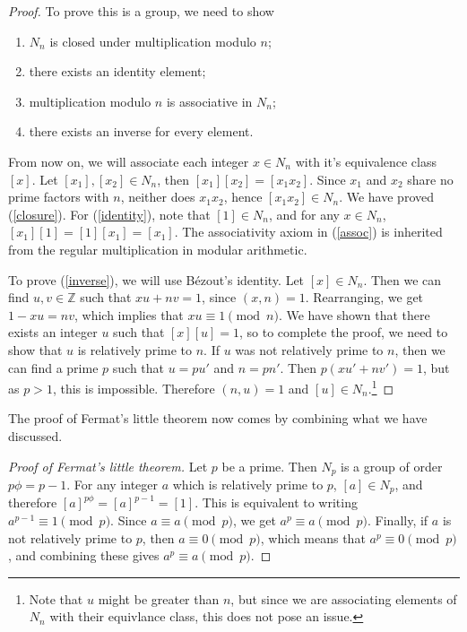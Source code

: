 \documentclass[12pt]{article}
\theoremstyle{theorem}
\theoremstyle{theorem}
\theoremstyle{definition}
\theoremstyle{example}
\theoremstyle{remark}
\theoremstyle{propposition}
\theoremstyle{lemma}
\begin{document}
\begin{proof}
  To prove this is a group, we need to show
  \begin{enumerate}
  \item $N_n$ is closed under multiplication modulo $n$;\label{closure}
  \item there exists an identity element;\label{identity}
  \item multiplication modulo $n$ is associative in $N_n$;\label{assoc}
  \item there exists an inverse for every element.\label{inverse}
  \end{enumerate}

  From now on, we will associate each integer $x\in N_n$ with it's equivalence class $[x]$. Let $[x_1],[x_2]\in N_n$, then $[x_1][x_2]=[x_1x_2]$. Since $x_1$ and $x_2$ share no prime factors with $n$, neither does $x_1x_2$, hence $[x_1x_2]\in N_n$. We have proved (\ref{closure}). For (\ref{identity}), note that $[1]\in N_n$, and for any $x\in N_n$, $[x_1][1]=[1][x_1]=[x_1]$. The associativity axiom in (\ref{assoc}) is inherited from the regular multiplication in modular arithmetic.

  To prove (\ref{inverse}), we will use Bézout's identity. Let $[x]\in N_n$. Then we can find $u,v\in\mathbb{Z}$ such that $xu+nv=1$, since $(x,n)=1$. Rearranging, we get $1-xu=nv$, which implies that $xu\equiv 1\pmod n$. We have shown that there exists an integer $u$ such that $[x][u]=1$, so to complete the proof, we need to show that $u$ is relatively prime to $n$. If $u$ was not relatively prime to $n$, then we can find a prime $p$ such that $u=pu'$ and $n=pn'$. Then $p(xu'+nv')=1$, but as $p>1$, this is impossible. Therefore $(n,u)=1$ and $[u]\in N_n$.\footnote{Note that $u$ might be greater than $n$, but since we are associating elements of $N_n$ with their equivlance class, this does not pose an issue.}
  
\end{proof}

The proof of Fermat's little theorem now comes by combining what we have discussed.

\begin{proof}[Proof of Fermat's little theorem]
  Let $p$ be a prime. Then $N_p$ is a group of order $p\phi=p-1$. For any integer $a$ which is relatively prime to $p$, $[a]\in N_p$, and therefore $[a]^{p\phi}=[a]^{p-1}=[1]$. This is equivalent to writing $a^{p-1}\equiv 1\pmod p$. Since $a\equiv a\pmod p$, we get $a^p\equiv a\pmod p$. Finally, if $a$ is not relatively prime to $p$, then $a\equiv 0\pmod p$, which means that $a^p\equiv 0\pmod p$, and combining these gives $a^p\equiv a\pmod p$.
\end{proof}
\end{document}
